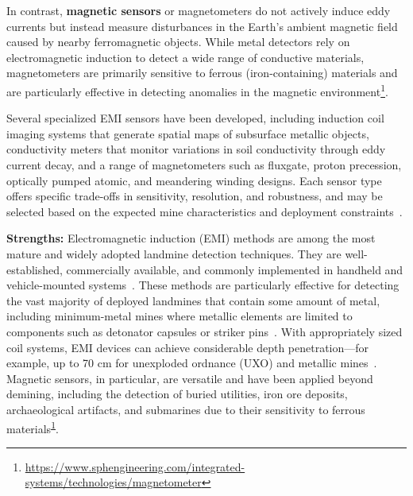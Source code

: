 In contrast, \textbf{magnetic sensors} or magnetometers do not actively induce eddy currents but instead measure disturbances in the Earth's ambient magnetic field caused by nearby ferromagnetic objects. While metal detectors rely on electromagnetic induction to detect a wide range of conductive materials, magnetometers are primarily sensitive to ferrous (iron-containing) materials and are particularly effective in detecting anomalies in the magnetic environment\footnote{\label{magnetometerfootnote}\url{https://www.sphengineering.com/integrated-systems/technologies/magnetometer}}.

Several specialized EMI sensors have been developed, including induction coil imaging systems that generate spatial maps of subsurface metallic objects, conductivity meters that monitor variations in soil conductivity through eddy current decay, and a range of magnetometers such as fluxgate, proton precession, optically pumped atomic, and meandering winding designs. Each sensor type offers specific trade-offs in sensitivity, resolution, and robustness, and may be selected based on the expected mine characteristics and deployment constraints~\cite{Gooneratne2004ARO, Bruschini1997ASO}.

\textbf{Strengths:} Electromagnetic induction (EMI) methods are among the most mature and widely adopted landmine detection techniques. They are well-established, commercially available, and commonly implemented in handheld and vehicle-mounted systems~\cite{gichd2006guidebook}. These methods are particularly effective for detecting the vast majority of deployed landmines that contain some amount of metal, including minimum-metal mines where metallic elements are limited to components such as detonator capsules or striker pins~\cite{gichd2006guidebook}. With appropriately sized coil systems, EMI devices can achieve considerable depth penetration—for example, up to 70 cm for unexploded ordnance (UXO) and metallic mines~\cite{gichd2006guidebook}. Magnetic sensors, in particular, are versatile and have been applied beyond demining, including the detection of buried utilities, iron ore deposits, archaeological artifacts, and submarines due to their sensitivity to ferrous materials\textsuperscript{\ref{magnetometerfootnote}}.

